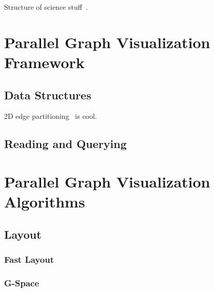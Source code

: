 \documentclass[pdf,12pt,report,strict]{SANDreport}
\newcommand*{\lcite}[1]{~\cite{#1}}
\begin{document}

Structure of science stuff\lcite{Boyack04,Boyack05}.



\chapter{Parallel Graph Visualization Framework}
\label{sec:ParallelGraphVisualizationFramework}

\section{Data Structures}
\label{sec:ParallelGraphVisualizationFramework:DataStructures}



2D edge partitioning\lcite{Yoo05} is cool.


\section{Reading and Querying}
\label{sec:ParallelGraphVisualizationFramework:ReadingAndQuerying}


\chapter{Parallel Graph Visualization Algorithms}
\label{chap:ParallelGraphVisualizationAlgorithms}

\section{Layout}
\label{sec:Layout}

\subsection{Fast Layout}
\label{sec:Layout:FastLayout}

\subsection{G-Space}
\label{sec:Layout:GSpace}
\end{document}
